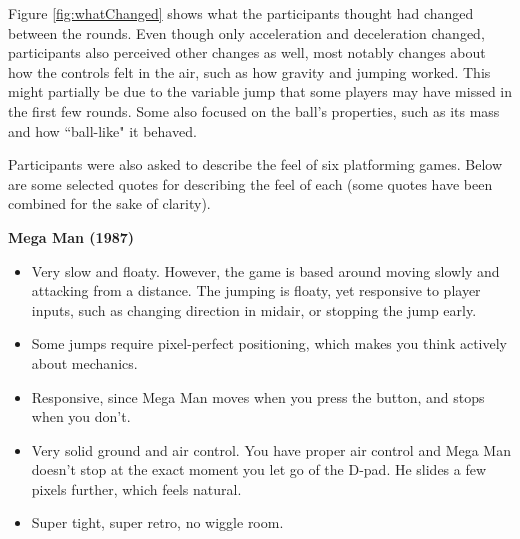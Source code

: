 
Figure \ref{fig:whatChanged} shows what the participants thought had changed between the rounds. Even though only acceleration and deceleration changed, participants also perceived other changes as well, most notably changes about how the controls felt in the air, such as how gravity and jumping worked. This might partially be due to the variable jump that some players may have missed in the first few rounds. Some also focused on the ball's properties, such as its mass and how ``ball-like" it behaved. 

Participants were also asked to describe the feel of six platforming games. Below are some selected quotes for describing the feel of each (some quotes have been combined for the sake of clarity).

\textbf{Mega Man (1987)}
\vspace{-5mm}
\begin{itemize}[noitemsep,nolistsep]
\item Very slow and floaty. However, the game is based around moving slowly and attacking from a distance. The jumping is floaty, yet responsive to player inputs, such as changing direction in midair, or stopping the jump early. 
\item Some jumps require pixel-perfect positioning, which makes you think actively about mechanics.
\item Responsive, since Mega Man moves when you press the button, and stops when you don't.
\item Very solid ground and air control. You have proper air control and Mega Man doesn't stop at the exact moment you let go of the D-pad. He slides a few pixels further, which feels natural.
\item Super tight, super retro, no wiggle room.
\end{itemize}

